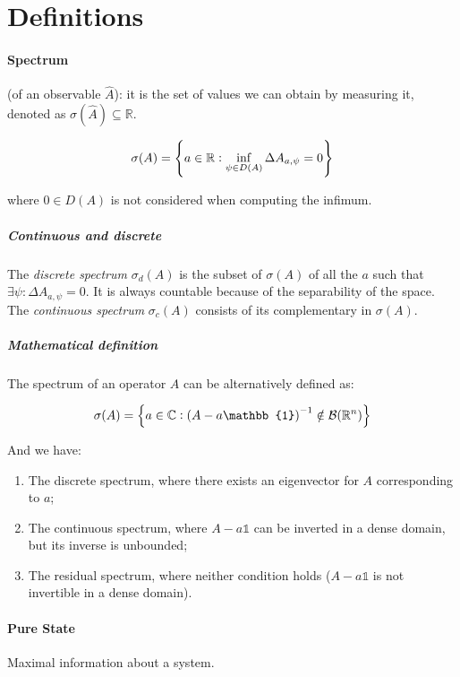
\section{Definitions}

\paragraph{Spectrum} (of an observable $\hat{A}$): it is the set of values we can obtain by measuring it, denoted as $\sigma(\hat{A}) \subseteq \mathbb{R}$.

\begin{equation}
    \sigma(A) = \qty{
    a \in \mathbb{R}: \inf_{\psi \in D(A)} \Delta A_{a, \psi} = 0
    }
\end{equation}

where $0 \in D(A)$ is not considered when computing the infimum.

\subparagraph{Continuous and discrete} The \emph{discrete spectrum} $\sigma_d(A)$ is the subset of $\sigma (A)$ of all the $a$ such that $\exists \psi : \Delta A _{a, \psi} = 0$. It is always countable because of the separability of the space. The \emph{continuous spectrum} $\sigma_c(A)$ consists of its complementary in $\sigma(A)$.

\subparagraph{Mathematical definition} The spectrum of an operator $A$ can be alternatively defined as:

\begin{equation}
\sigma(A) = \qty{
a \in \mathbb{C}: \qty(A - a\mathbb{1})^{-1} \notin \mathcal{B}(\mathbb{R}^n)
}    
\end{equation}

And we have:

\begin{enumerate}
    \item The discrete spectrum, where there exists an eigenvector for $A$ corresponding to $a$;
    \item The continuous spectrum, where $A-a\mathbb{1}$ can be inverted in a dense domain, but its inverse is unbounded;
    \item The residual spectrum, where neither condition holds ($A-a\mathbb{1}$ is not invertible in a dense domain).
\end{enumerate}

\paragraph{Pure State} Maximal information about a system. 

